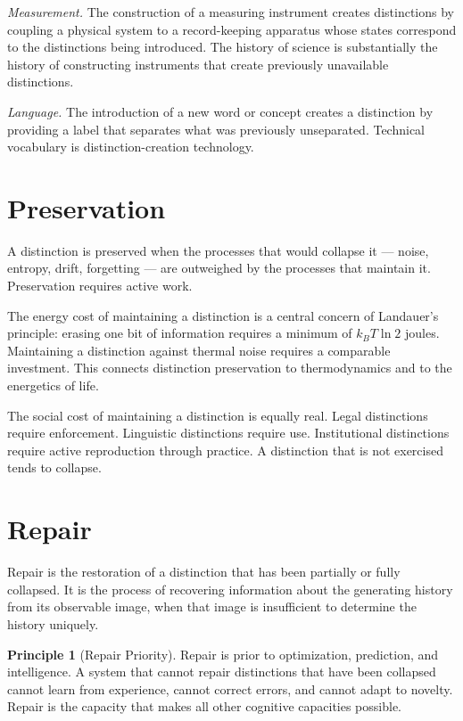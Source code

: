 \documentclass[12pt,a4paper]{book}
\theoremstyle{remark}
\theoremstyle{definition}
\newtheorem{principle}{Principle}[chapter]
\begin{document}
\textit{Measurement.} The construction of a measuring instrument creates
distinctions by coupling a physical system to a record-keeping apparatus
whose states correspond to the distinctions being introduced. The history
of science is substantially the history of constructing instruments that
create previously unavailable distinctions.

\textit{Language.} The introduction of a new word or concept creates a
distinction by providing a label that separates what was previously
unseparated. Technical vocabulary is distinction-creation technology.

\section{Preservation}

A distinction is preserved when the processes that would collapse it ---
noise, entropy, drift, forgetting --- are outweighed by the processes
that maintain it. Preservation requires active work.

The energy cost of maintaining a distinction is a central concern of
Landauer's principle: erasing one bit of information requires a minimum
of $k_BT\ln 2$ joules. Maintaining a distinction against thermal noise
requires a comparable investment. This connects distinction preservation
to thermodynamics and to the energetics of life.

The social cost of maintaining a distinction is equally real. Legal
distinctions require enforcement. Linguistic distinctions require use.
Institutional distinctions require active reproduction through practice.
A distinction that is not exercised tends to collapse.

\section{Repair}

Repair is the restoration of a distinction that has been partially or
fully collapsed. It is the process of recovering information about the
generating history from its observable image, when that image is
insufficient to determine the history uniquely.

\begin{principle}[Repair Priority]
Repair is prior to optimization, prediction, and intelligence. A system
that cannot repair distinctions that have been collapsed cannot learn from
experience, cannot correct errors, and cannot adapt to novelty. Repair
is the capacity that makes all other cognitive capacities possible.
\end{principle}
\end{document}
